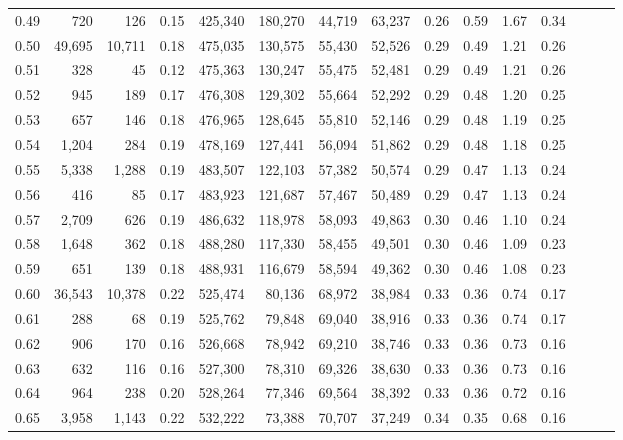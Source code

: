 \begin{tabular}{rrrrrrrrrrrrrrr}
0.49 &     720 &     126 &  0.15 &  425,340 &  180,270 &   44,719 &   63,237 &  0.26 &  0.59 &  1.67 &      0.34 \\
0.50 &  49,695 &  10,711 &  0.18 &  475,035 &  130,575 &   55,430 &   52,526 &  0.29 &  0.49 &  1.21 &      0.26 \\
0.51 &     328 &      45 &  0.12 &  475,363 &  130,247 &   55,475 &   52,481 &  0.29 &  0.49 &  1.21 &      0.26 \\
0.52 &     945 &     189 &  0.17 &  476,308 &  129,302 &   55,664 &   52,292 &  0.29 &  0.48 &  1.20 &      0.25 \\
0.53 &     657 &     146 &  0.18 &  476,965 &  128,645 &   55,810 &   52,146 &  0.29 &  0.48 &  1.19 &      0.25 \\
0.54 &   1,204 &     284 &  0.19 &  478,169 &  127,441 &   56,094 &   51,862 &  0.29 &  0.48 &  1.18 &      0.25 \\
0.55 &   5,338 &   1,288 &  0.19 &  483,507 &  122,103 &   57,382 &   50,574 &  0.29 &  0.47 &  1.13 &      0.24 \\
0.56 &     416 &      85 &  0.17 &  483,923 &  121,687 &   57,467 &   50,489 &  0.29 &  0.47 &  1.13 &      0.24 \\
0.57 &   2,709 &     626 &  0.19 &  486,632 &  118,978 &   58,093 &   49,863 &  0.30 &  0.46 &  1.10 &      0.24 \\
0.58 &   1,648 &     362 &  0.18 &  488,280 &  117,330 &   58,455 &   49,501 &  0.30 &  0.46 &  1.09 &      0.23 \\
0.59 &     651 &     139 &  0.18 &  488,931 &  116,679 &   58,594 &   49,362 &  0.30 &  0.46 &  1.08 &      0.23 \\
0.60 &  36,543 &  10,378 &  0.22 &  525,474 &   80,136 &   68,972 &   38,984 &  0.33 &  0.36 &  0.74 &      0.17 \\
0.61 &     288 &      68 &  0.19 &  525,762 &   79,848 &   69,040 &   38,916 &  0.33 &  0.36 &  0.74 &      0.17 \\
0.62 &     906 &     170 &  0.16 &  526,668 &   78,942 &   69,210 &   38,746 &  0.33 &  0.36 &  0.73 &      0.16 \\
0.63 &     632 &     116 &  0.16 &  527,300 &   78,310 &   69,326 &   38,630 &  0.33 &  0.36 &  0.73 &      0.16 \\
0.64 &     964 &     238 &  0.20 &  528,264 &   77,346 &   69,564 &   38,392 &  0.33 &  0.36 &  0.72 &      0.16 \\
0.65 &   3,958 &   1,143 &  0.22 &  532,222 &   73,388 &   70,707 &   37,249 &  0.34 &  0.35 &  0.68 &      0.16 \\

\end{tabular}

